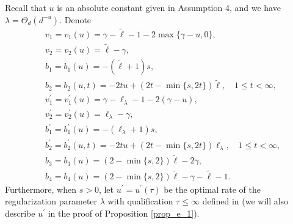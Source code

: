 \documentclass{article}
\theoremstyle{plain}
\theoremstyle{definition}
\theoremstyle{remark}
\begin{document}
\begin{appendix}
Recall that $u$ is an absolute constant given in Assumption 4, and we have $\lambda = \Theta_d\left(d^{-u}\right)$. Denote
\begin{equation}\label{eqn_order_in_bias_and_variance}
    \begin{aligned}
    &~v_1 = v_1(u) = \gamma - \tilde{\ell} - 1 - 2  \max\{\gamma - u, 0\},\\
    &~v_2 = v_2(u) =  \tilde{\ell} - \gamma,\\
    &~b_1 = b_1(u) = -(\tilde{\ell} + 1)  s,\\
    &~b_2 = b_2(u, t) = -2  t  u + (2  t - \min\{s, 2t\})  \tilde{\ell}, \quad 1 \leq t<\infty,\\
    &~v_1^{\prime} = v_1^{\prime}(u) = \gamma - \ell_{\lambda} - 1 - 2(\gamma - u),\\
    &~v_2^{\prime} = v_2^{\prime}(u) =  \ell_{\lambda} - \gamma,\\
    &~b_1^{\prime} = b_1^{\prime}(u) = -(\ell_{\lambda} + 1)  s,\\
    &~b_2^{\prime} = b_2^{\prime}(u, t) = -2  t  u + (2  t - \min\{s, 2t\})  \ell_{\lambda}, \quad 1 \leq t<\infty,\\
    &~b_3 = b_3(u) =  (2 - \min\{s, 2\})  \tilde{\ell} -2  \gamma,\\
    &~b_4 = b_4(u) = (2 - \min\{s, 2\})  \tilde{\ell} -\gamma - \tilde{\ell} - 1.
    \end{aligned}
\end{equation}
Furthermore, when $s>0$,
let $u^{\prime} = u^{\prime}(\tau)$ be the optimal rate of the regularization parameter $\lambda$ with qualification $\tau \leq \infty$ defined in \cite{lu2024saturation} (we will also describe $u^{\prime}$ in the proof of Proposition \ref{prop_e_1}). 


\end{appendix}
\end{document}
